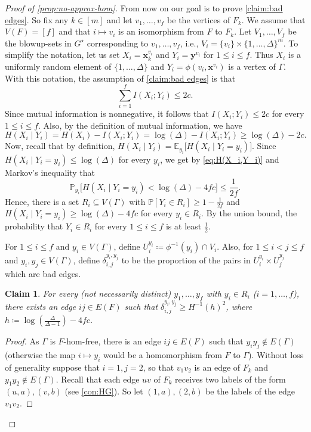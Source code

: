 \documentclass[reqno, english, 12pt]{amsart}
\theoremstyle{plain}
\newtheorem{claim}[theorem]{Claim}
\theoremstyle{remark}
\newcommand{\bx}{\mathbf{x}}
\newcommand{\by}{\mathbf{y}}
\renewcommand{\leq}{\leqslant}
\renewcommand{\geq}{\geqslant}
\begin{document}
\begin{proof}[Proof of \cref{prop:no-approx-hom}]
	From now on our goal is to prove \cref{claim:bad edges}. 
	So fix any $k \in [m]$ and let $v_1,\dots,v_f$ be the vertices of $F_k$.
	We assume that $V(F) = [f]$ and that $i \mapsto v_i$ is an isomorphism from $F$ to $F_k$. 
	Let $V_1,\dots,V_f$ be the blowup-sets in $G^{\star}$ corresponding to $v_1,\dots,v_f$, i.e., $V_i = \{v_i\} \times \{1,\dots,\Delta\}^m$. 
	To simplify the notation, let us set $X_i = \bx^{v_i}_k$ and $Y_i = \by^{v_i}$ for $1 \leq i \leq f$. 
	Thus $X_i$ is a uniformly random element of $\{1,\dots,\Delta\}$ and $Y_i = \phi(v_i,\bx^{v_i})$ is a vertex of $\Gamma$. With this notation, the assumption of \cref{claim:bad edges} is that
	$$
	\sum_{i = 1}^f I(X_i;Y_i) \leq 2c.
	$$
	Since mutual information is nonnegative, it follows that $I(X_i;Y_i) \leq 2c$ for every $1 \leq i \leq f$. 
	Also, by the definition of mutual information, we have
	\begin{equation}\label{eq:H(X_i,Y_i)}
	H(X_i \mid Y_i) = H(X_i) - I(X_i;Y_i) = \log(\Delta) - I(X_i;Y_i) \geq \log(\Delta) - 2c.
	\end{equation}  
	Now, recall that by definition, $H(X_i\mid Y_i) = \mathbb{E}_{y_i}\big[ H(X_i\mid Y_i = y_i) \big]$. 
	Since $H(X_i\mid Y_i = y_i) \leq \log(\Delta)$ for every $y_i$, we get by \eqref{eq:H(X_i,Y_i)} and Markov's inequality that 
	$$
	\mathbb{P}_{y_i}\Big[ H(X_i\mid Y_i = y_i) < \log(\Delta) - 4fc\Big] \leq \frac{1}{2f}.
	$$
	Hence, there is a set $R_i \subseteq V(\Gamma)$ with $\mathbb{P}[Y_i \in R_i] \geq 1 - \frac{1}{2f}$ and $H(X_i\mid Y_i = y_i) \geq \log(\Delta) - 4fc$ for every $y_i \in R_i$. By the union bound, the probability that $Y_i \in R_i$ for every $1 \leq i \leq f$ is \nolinebreak at \nolinebreak least \nolinebreak $\frac{1}{2}$.
	

	For $1 \leq i \leq f$ and $y_i \in V(\Gamma)$, define 
	$U_i^{y_i} \coloneqq \phi^{-1}(y_i)\cap V_i$. 
	Also, for $1 \leq i < j \leq f$ and $y_i,y_j \in V(\Gamma)$, define $\delta_{i,j}^{y_i,y_j}$ to be the proportion of the pairs in $U_i^{y_i} \times U_j^{y_j}$ which are bad edges.
	\begin{claim}
	\label{claim:one triple}
		For every (not necessarily distinct) $y_1,\dots,y_f$ with $y_i \in R_i$ ($i = 1,\dots,f$), there exists an edge $ij \in E(F)$ such that $\delta_{i,j}^{y_i,y_j} \geq H^{-1}(h)^2$, where $h \coloneqq \log(\frac{\Delta}{\Delta-1}) - 4fc$. 
	\end{claim}
	\begin{proof}
		As $\Gamma$ is $F$-hom-free, 
		there is an edge $ij \in E(F)$ such that $y_iy_j \notin E(\Gamma)$ (otherwise the map $i \mapsto y_i$ would be a homomorphism from $F$ to $\Gamma$).
		Without loss of generality suppose that $i=1,j=2$, so that $v_1v_2$ is an edge of $F_k$ and $y_1y_2 \notin E(\Gamma)$.
		Recall that each edge $uv$ of $F_k$ receives two labels of the form $(u,a),(v,b)$ (see \cref{con:HG}). So let $(1,a), (2,b)$ be the labels of the edge $v_1v_2$. 



\end{proof}
\end{proof}
\end{document}
